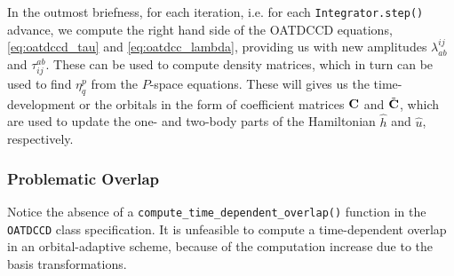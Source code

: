     In the outmost briefness, for each iteration, i.e. for each 
    \lstinline{Integrator.step()} advance, we 
    compute the right hand side of the OATDCCD equations, \autoref{eq:oatdccd_tau} 
    and \autoref{eq:oatdcc_lambda}, providing us with new amplitudes 
    $\lambda^{ij}_{ab}$ and $\tau^{ab}_{ij}$. These can be used to compute density 
    matrices, which in turn can be used to find $\eta^p_q$ from the $P$-space 
    equations. These will gives us the time-development or the orbitals in 
    the form of coefficient matrices $\vb{C}$ and $\tilde{\vb{C}}$, which are used 
    to update the one- and two-body parts of the Hamiltonian $\hat{h}$ and $\hat{u}$,
    respectively.

    

    \subsubsection{Problematic Overlap}

    Notice the absence of a \lstinline{compute_time_dependent_overlap()} function
    in the \lstinline{OATDCCD} class specification. It is unfeasible to compute 
    a time-dependent overlap in an orbital-adaptive scheme, because of the 
    computation increase due to the basis transformations.

